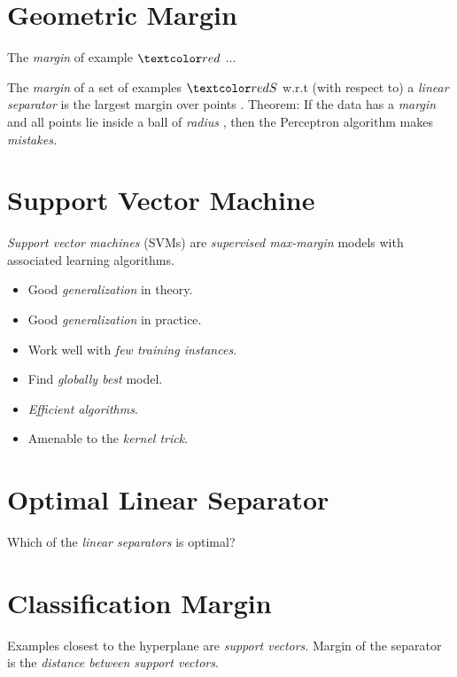 \documentclass[
	title={SVM}
]{cs584notes}
\begin{document}
\section{Geometric Margin}\label{sec:geometric-margin}
The \emph{margin} of example $\data{}$ $\dots$

The \emph{margin} \data{$\gamma$} of a set of examples $\data{S}$ w.r.t (with respect to)  a \emph{linear separator}  is the largest margin over points .
Theorem: If the data has a \emph{margin} \data{$\gamma$} and all points lie inside a ball of \emph{radius} , then the Perceptron algorithm makes  \emph{mistakes.}

\section{Support Vector Machine}\label{sec:svm}
\emph{Support vector machines} (SVMs) are \emph{supervised max-margin} models with associated learning algorithms.
\begin{itemize}
	\item Good \emph{generalization} in theory.
	\item Good \emph{generalization} in practice.
	\item Work well with \emph{few training instances}.
	\item Find \emph{globally best} model.
	\item \emph{Efficient algorithms}.
	\item Amenable to the \emph{kernel trick}.
\end{itemize}

\section{Optimal Linear Separator}\label{sec:optimal-linear-separator}
Which of the \emph{linear separators} is optimal?

\section{Classification Margin}\label{sec:classification-margin}
Examples closest to the hyperplane are \emph{support vectors}.
Margin \data{$\rho$} of the separator is the \emph{distance between support vectors}.
\end{document}
